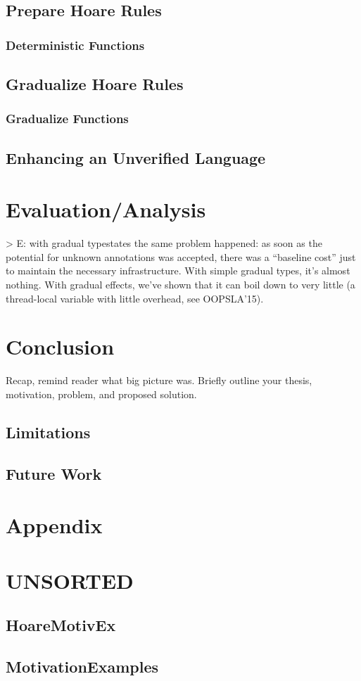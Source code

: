 \section{Prepare Hoare Rules}

\subsection{Deterministic Functions}

\section{Gradualize Hoare Rules}

\subsection{Gradualize Functions}

\section{Enhancing an Unverified Language}


\chapter{Evaluation/Analysis}
> E:
with gradual typestates the same problem happened: as soon as the potential for unknown annotations was accepted, there was a “baseline cost” just to maintain the necessary infrastructure.
With simple gradual types, it’s almost nothing. With gradual effects, we’ve shown that it can boil down to very little (a thread-local variable with little overhead, see OOPSLA’15). 


\chapter{Conclusion}
Recap, remind reader what big picture was.
Briefly outline your thesis, motivation, problem, and proposed solution.

\section{Limitations}

\section{Future Work}


\chapter{Appendix}


\chapter{UNSORTED}

\section{HoareMotivEx}
\label{sec:hoaremotivex}


\section{MotivationExamples}
\label{sec:motivationexamples}

